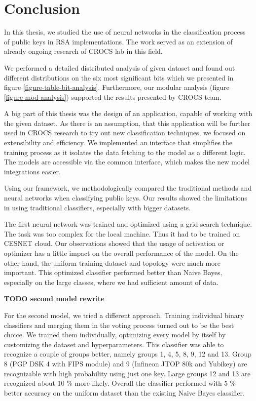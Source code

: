 \chapter{Conclusion}

In this thesis, we studied the use of neural networks in the classification process of public keys in RSA implementations. The work served as an extension of already ongoing research of CROCS lab in this field. 

We performed a detailed distributed analysis of given dataset and found out different distributions on the six most significant bits which we presented in figure \ref{figure-table-bit-analysis}. Furthermore, our modular analysis (figure \ref{figure-mod-analysis}) supported the results presented by CROCS team.

A big part of this thesis was the design of an application, capable of working with the given dataset. As there is an assumption, that this application will be further used in CROCS research to try out new classification techniques, we focused on extensibility and efficiency. We implemented an interface that simplifies the training process as it isolates the data fetching to the model as a different logic. The models are accessible via the common interface, which makes the new model integrations easier.

Using our framework, we methodologically compared the traditional methods and neural networks when classifying public keys. Our results showed the limitations in using traditional classifiers, especially with bigger datasets.

The first neural network was trained and optimized using a grid search technique. The task was too complex for the local machine. Thus it had to be trained on CESNET cloud. Our observations showed that the usage of activation or optimizer has a little impact on the overall performance of the model. On the other hand, the uniform training dataset and topology were much more important. This optimized classifier performed better than Naive Bayes, especially on the large classes, where we had sufficient amount of data.

\textbf{TODO second model rewrite}

For the second model, we tried a different approach. Training individual binary classifiers and merging them in the voting process turned out to be the best choice. We trained them individually, optimizing every model by itself by customizing the dataset and hyperparameters. This classifier was able to recognize a couple of groups better, namely groups 1, 4, 5, 8, 9, 12 and 13. Group 8 (PGP DSK 4 with FIPS module) and 9 (Infineon JTOP 80k and Yubikey) are recognizable with high probability using just one key. Large groups 12 and 13 are recognized about 10 \% more likely. Overall the classifier performed with 5 \% better accuracy on the uniform dataset than the existing Naive Bayes classifier.

